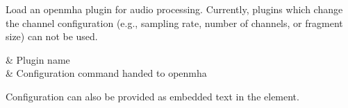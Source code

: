 Load an openmha plugin for audio processing. Currently, plugins which
change the channel configuration (e.g., sampling rate, number of
channels, or fragment size) can not be used.

\begin{tscattributes}
 & Plugin name\\
 & Configuration command handed to openmha\\
\end{tscattributes}

Configuration can also be provided as embedded text in the
 element.

